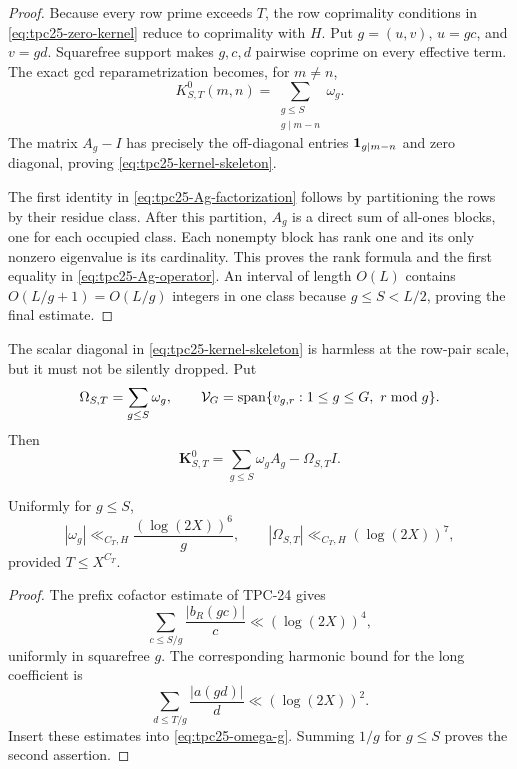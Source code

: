\begin{proof}
Because every row prime exceeds \(T\), the row coprimality conditions
in \eqref{eq:tpc25-zero-kernel} reduce to coprimality with \(H\).  Put
\(g=(u,v)\), \(u=gc\), and \(v=gd\).  Squarefree support makes
\(g,c,d\) pairwise coprime on every effective term.  The exact gcd
reparametrization becomes, for \(m\ne n\),
\[
 K^0_{S,T}(m,n)
 =\sum_{\substack{g\le S\\g\mid m-n}}\omega_g.
\]
The matrix \(A_g-I\) has precisely the off-diagonal entries
\(\mathbf 1_{g\mid m-n}\) and zero diagonal, proving
\eqref{eq:tpc25-kernel-skeleton}.

The first identity in \eqref{eq:tpc25-Ag-factorization} follows by
partitioning the rows by their residue class.  After this partition,
\(A_g\) is a direct sum of all-ones blocks, one for each occupied class.
Each nonempty block has rank one and its only nonzero eigenvalue is its
cardinality.  This proves the rank formula and the first equality in
\eqref{eq:tpc25-Ag-operator}.  An interval of length \(O(L)\) contains
\(O(L/g+1)=O(L/g)\) integers in one class because
\(g\le S<L/2\), proving the final estimate.
\end{proof}

The scalar diagonal in \eqref{eq:tpc25-kernel-skeleton} is harmless at
the row-pair scale, but it must not be silently dropped.  Put
\begin{equation}
 \Omega_{S,T}=\sum_{g\le S}\omega_g,
 \qquad
 \mathcal V_G=\operatorname{span}
 \{v_{g,r}:1\le g\le G,\ r\bmod g\}.
 \label{eq:tpc25-deflation-space}
\end{equation}
Then
\[
 \mathbf K^0_{S,T}
 =\sum_{g\le S}\omega_gA_g-\Omega_{S,T}I.
\]

\begin{lemma}
\label{lem:tpc25-omega-bound}
Uniformly for \(g\le S\),
\begin{equation}
 |\omega_g|\ll_{C_T,H}\frac{(\log(2X))^6}{g},
 \qquad
 |\Omega_{S,T}|\ll_{C_T,H}(\log(2X))^7,
 \label{eq:tpc25-omega-bound}
\end{equation}
provided \(T\le X^{C_T}\).
\end{lemma}

\begin{proof}
The prefix cofactor estimate of TPC-24 gives
\[
 \sum_{c\le S/g}\frac{|b_R(gc)|}{c}
 \ll(\log(2X))^4,
\]
uniformly in squarefree \(g\).  The corresponding harmonic bound for
the long coefficient is
\[
 \sum_{d\le T/g}\frac{|a(gd)|}{d}
 \ll(\log(2X))^2.
\]
Insert these estimates into \eqref{eq:tpc25-omega-g}.  Summing
\(1/g\) for \(g\le S\) proves the second assertion.
\end{proof}

